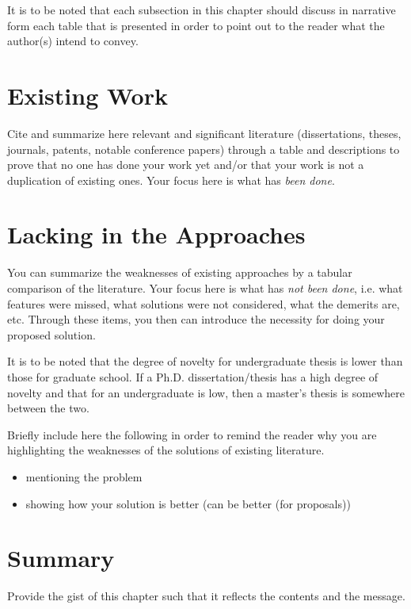 It is to be noted that each subsection in this chapter should discuss in narrative form each table that is presented in order to point out to the reader what the author(s) intend to convey.

\section{Existing Work}

Cite and summarize here relevant and significant literature (dissertations, theses, journals, patents, notable conference papers) through a table and descriptions to prove that no one has done your work yet and/or that your work is not a duplication of existing ones. Your focus here is what has \emph{been done}.


\section{Lacking in the Approaches}

You can summarize the weaknesses of existing approaches by a tabular comparison of the literature. Your focus here is what has \emph{not been done}, i.e. what features were missed, what solutions were not considered, what the demerits are, etc.  Through these items, you then can introduce the necessity for doing your proposed solution.  

It is to be noted that the degree of novelty for undergraduate thesis is lower than those for graduate school. If a Ph.D. dissertation/thesis has a high degree of novelty and that for an undergraduate is low, then a master's thesis is somewhere between the two.

Briefly include here the following in order to remind the reader why you are highlighting the weaknesses of the solutions of existing literature. 

\begin{itemize}
	\item mentioning the problem
	\item showing how your solution is better (can be better (for proposals))
\end{itemize}



\section{Summary}

Provide the gist of this chapter such that it reflects the contents and the message.




